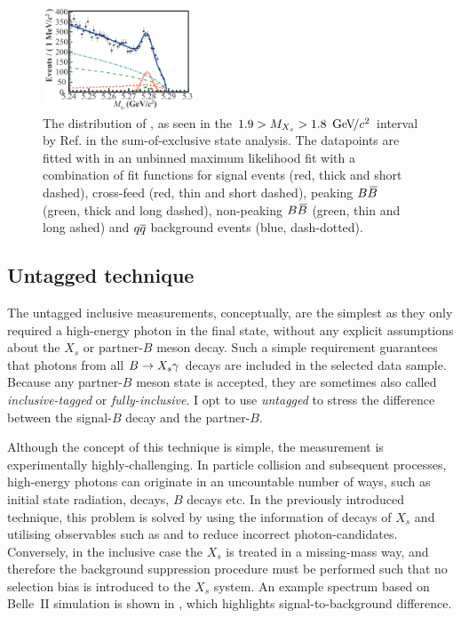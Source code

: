 \begin{figure}[htbp!]
    \centering
    \includegraphics[width=0.4\textwidth]{figures/experiment_overview/Mbc_sum_exclusive_Belle.png}
    \caption{\label{fig:mbc_sum_of_exclusive} 
    The distribution of \Mbc, as seen in the $1.9>M_{X_s}>1.8~{\mathrm{\,Ge\kern -0.1em V\!/}c^2}$ interval by Ref.\cite{Belle:2014nmp} in the sum-of-exclusive state analysis.
    The datapoints are fitted with in an unbinned maximum likelihood fit with a combination of fit functions for 
    signal events (red, thick and short dashed), 
    cross-feed (red, thin and short dashed), 
    peaking $B\kern 0.18em\overline{\kern -0.18em B}{}$ (green, thick and long dashed), 
    non-peaking $B\kern 0.18em\overline{\kern -0.18em B}{}$ (green, thin and long ashed)
    and $q\overline q$ background events (blue, dash-dotted).
    }
\end{figure}

\subsection{Untagged technique}\label{sec:untagged}
The untagged inclusive measurements, conceptually, are the simplest as they only required a high-energy photon in the final state, without any explicit assumptions about the $X_s$ or partner-$B$ meson decay.
Such a simple requirement guarantees that photons from all $\BtoXsgamma$ decays are included in the selected data sample.
Because any partner-$B$ meson state is accepted, they are sometimes also called \textit{inclusive-tagged} or \textit{fully-inclusive}.
I opt to use \textit{untagged} to stress the difference between the signal-$B$ decay and the partner-$B$.

Although the concept of this technique is simple, the measurement is experimentally highly-challenging.
In particle collision and subsequent processes, high-energy photons can originate in an uncountable number of ways, such as initial \epem state radiation, \epem\ra\qqbar decays, $B$ decays etc.
In the previously introduced  technique, this problem is solved by using the information of decays of $X_s$ and utilising observables such as \Mbc and \DeltaE to reduce incorrect photon-candidates. 
Conversely, in the inclusive case the $X_s$ is treated in a missing-mass way, and therefore the background suppression procedure must be performed such that no selection bias is introduced to the $X_s$ system.
An example spectrum based on Belle~II simulation is shown in , which highlights signal-to-background difference.

